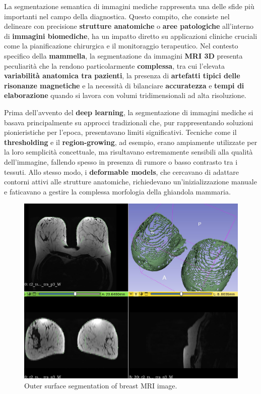 

La segmentazione semantica di immagini mediche rappresenta una delle sfide più importanti nel campo della diagnostica. Questo compito, che consiste nel delineare con precisione \textbf{strutture anatomiche} o \textbf{aree patologiche} all’interno di \textbf{immagini biomediche}, ha un impatto diretto su applicazioni cliniche cruciali come la pianificazione chirurgica e il monitoraggio terapeutico. Nel contesto specifico della \textbf{mammella}, la segmentazione da immagini \textbf{MRI 3D} presenta peculiarità che la rendono particolarmente \textbf{complessa}, tra cui l’elevata \textbf{variabilità anatomica tra pazienti}, la presenza di \textbf{artefatti tipici delle risonanze magnetiche} e la necessità di bilanciare \textbf{accuratezza} e \textbf{tempi di elaborazione} quando si lavora con volumi tridimensionali ad alta risoluzione.


Prima dell’avvento del \textbf{deep learning}, la segmentazione di immagini mediche si basava principalmente su approcci tradizionali che, pur rappresentando soluzioni pionieristiche per l’epoca, presentavano limiti significativi. Tecniche come il \textbf{thresholding} e il \textbf{region-growing}, ad esempio, erano ampiamente utilizzate per la loro semplicità concettuale, ma risultavano estremamente sensibili alla qualità dell’immagine, fallendo spesso in presenza di rumore o basso contrasto tra i tessuti. Allo stesso modo, i \textbf{deformable models}, che cercavano di adattare contorni attivi alle strutture anatomiche, richiedevano un’inizializzazione manuale e faticavano a gestire la complessa morfologia della ghiandola mammaria.

\begin{figure}[H] 
  	\centering 
 	\includegraphics[width=.8\textwidth]{images/2025-08-09-19-12-14.png} 
	\caption{Outer surface segmentation of breast MRI image. \cite{breast_mri_3d}}
	\label{fig:brain_mri_3d}
 \end{figure} 


